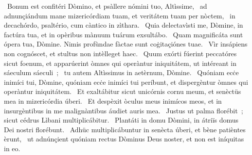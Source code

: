 ~Bonum est confitéri Dòmino, et psàllere nómini tuo, Altìssime, 
~ad adnunçiándum mane mizericórdiam tuam, et veritátem tuam per nòctem, 
~in decachórdo, psaltério, cum càntico in zìthara. 
~Quia delectavìsti me, Dòmine, in factúra tua, et in opèribus mànuum tuárum exsultábo. 
~Quam magnificáta sunt ópera tua, Dòmine. Nimis profùndae fàctae sunt coġitaçiónes tuae. 
~Vìr insápiens non cognóscet, et stultus non intèlleget haec. 
~Quum exórti fúerint peccatóres sicut foenum, et apparúerint òmnes qui operàntur iniquitátem, ut intéreant in sáeculum sáeculi~; 
~tu autem Altìssimus in aetèrnum, Dòmine. 
~Quóniam ecċe inimíci tui, Dòmine, quóniam ecċe inimíci tui períbunt, et dispergèntur òmnes qui operàntur iniquitátem. 
~Et exaltábitur sicut unicórnis cornu meum, et senèctüs mea in mizericórdia úberi. 
~Et despèxit òculus meus inimícos meos, et in insurgèntibus in me malignàntibus áudiet auris mea. 
~Justus ut palma florébit~; sicut cédrus Lìbani multiplicábitur. 
~Plantáti in domu Dòmini, in átriïs domus Dei nostri florébunt. 
~Adhüc multiplicábuntur in senècta úberi, et bène patièntes èrunt, 
~ut adnúnçient quóniam rectus Dòminus Deus noster, et non est iníquitas in eo. 
